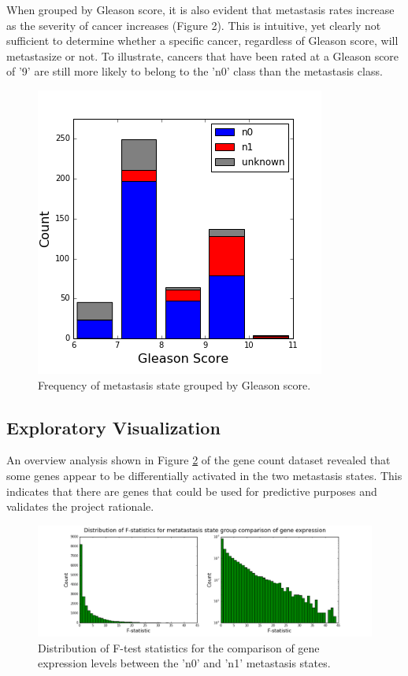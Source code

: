 \documentclass[final]{article}
\begin{document}
When grouped by Gleason score, it is also evident that metastasis rates increase
as the severity of cancer increases (Figure 2).  This is  intuitive, yet clearly
not sufficient to determine whether a specific cancer, regardless of Gleason
score, will metastasize or not.  To illustrate, cancers that have been rated at
a Gleason score of '9' are still more likely to belong to the 'n0' class than
the metastasis class.

\begin{figure}
  \centering
  \caption{Frequency of metastasis state grouped by Gleason score.\label{fig:preGSHist}}
  \includegraphics[scale=0.5]{GleasonHist}
\end{figure}

\subsection{Exploratory Visualization}

An overview analysis shown in Figure \ref{fig:FDist} of the gene count dataset revealed that
some genes appear to be differentially activated in the two metastasis states.
This indicates that there are genes that could be used for predictive purposes
and validates the project rationale.

\begin{figure}[h]
  \centering
  \includegraphics[width = \textwidth]{FDist}
  \caption{Distribution of F-test statistics for the comparison of gene expression levels between the 'n0' and 'n1' metastasis states.\label{fig:FDist}}
\end{figure}
\end{document}
